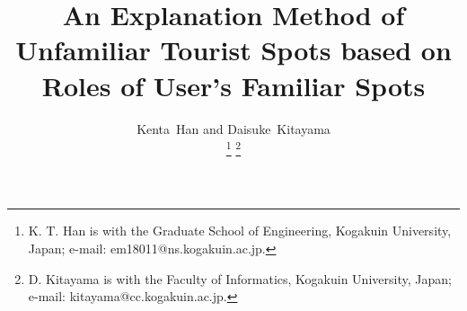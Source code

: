 \documentclass[journal]{IAENGtran}
\begin{document}
%
\title{An Explanation Method of Unfamiliar Tourist Spots based on Roles of User's Familiar Spots}
%
%
%

\author{Kenta~Han and Daisuke~Kitayama

\thanks{K. T. Han is with the Graduate School of Engineering, Kogakuin University, Japan; e-mail: em18011@ns.kogakuin.ac.jp.}%
\thanks{D. Kitayama is with the Faculty of Informatics, Kogakuin University, Japan;  e-mail: kitayama@cc.kogakuin.ac.jp.}}%

\maketitle

\pagestyle{empty}
\thispagestyle{empty}
\end{document}
